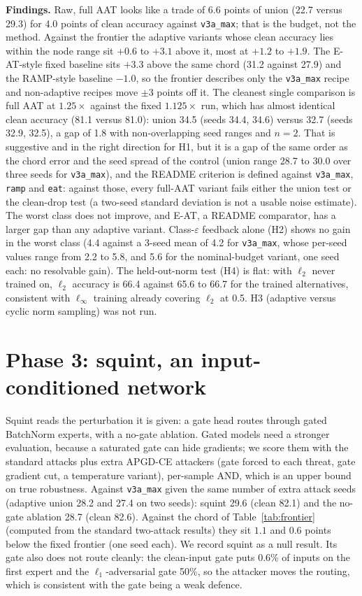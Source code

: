 \documentclass[11pt]{article}
\begin{document}
\textbf{Findings.} Raw, full AAT looks like a trade of 6.6 points of union (22.7 versus 29.3) for 4.0 points of clean accuracy against \texttt{v3a\_max}; that is the budget, not the method.
Against the frontier the adaptive variants whose clean accuracy lies within the node range sit $+0.6$ to $+3.1$ above it, most at $+1.2$ to $+1.9$. The E-AT-style fixed baseline sits $+3.3$ above the same chord (31.2 against 27.9) and the RAMP-style baseline $-1.0$, so the frontier describes only the \texttt{v3a\_max} recipe and non-adaptive recipes move $\pm3$ points off it. The cleanest single comparison is full AAT at $1.25\times$ against the fixed $1.125\times$ run, which has almost identical clean accuracy
(81.1 versus 81.0): union 34.5 (seeds 34.4, 34.6) versus 32.7 (seeds 32.9, 32.5), a gap of 1.8 with non-overlapping seed ranges and $n=2$.
That is suggestive and in the right direction for H1, but it is a gap of the same order as the chord error and the seed spread of the control (union range 28.7 to 30.0 over three seeds for \texttt{v3a\_max}),
and the README criterion is defined against \texttt{v3a\_max}, \texttt{ramp} and \texttt{eat}: against those, every full-AAT variant fails either the union test or the clean-drop test (a two-seed standard deviation is not a usable noise estimate). The worst class does not improve, and E-AT, a README comparator, has a larger gap than any adaptive variant.
Class-$\varepsilon$ feedback alone (H2) shows no gain in the worst class (4.4 against a 3-seed mean of 4.2 for \texttt{v3a\_max}, whose per-seed values range from 2.2 to 5.8, and 5.6 for the nominal-budget variant, one seed each: no resolvable gain). The held-out-norm test (H4) is flat: with $\ell_2$ never trained on,
$\ell_2$ accuracy is 66.4 against 65.6 to 66.7 for the trained alternatives, consistent with $\ell_\infty$ training already covering $\ell_2$ at 0.5. H3 (adaptive versus cyclic norm sampling) was not run.

\section{Phase 3: squint, an input-conditioned network}
Squint reads the perturbation it is given: a gate head routes through gated BatchNorm experts, with a no-gate ablation. Gated models need a stronger evaluation, because a saturated gate can hide gradients;
we score them with the standard attacks plus extra APGD-CE attackers (gate forced to each threat, gate gradient cut, a temperature variant), per-sample AND, which is an upper bound on true robustness.
Against \texttt{v3a\_max} given the same number of extra attack seeds (adaptive union 28.2 and 27.4 on two seeds): squint 29.6 (clean 82.1) and the no-gate ablation 28.7 (clean 82.6). Against the chord of Table~\ref{tab:frontier} (computed from the standard two-attack results) they sit $1.1$ and $0.6$ points below the fixed frontier (one seed each).
We record squint as a null result. Its gate also does not route cleanly: the clean-input gate puts 0.6\% of inputs on the first expert and the $\ell_1$-adversarial gate 50\%, so the attacker moves the routing, which is consistent with the gate being a weak defence.
\end{document}
